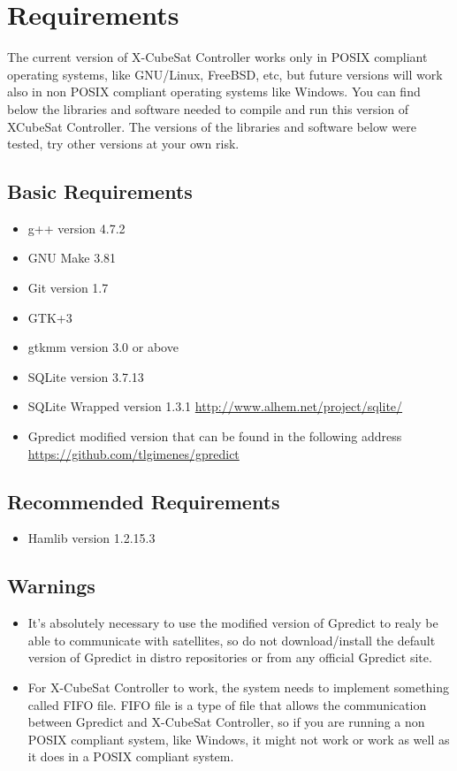 \documentclass[pdftex,11pt,a4paper,titlepage]{report}
\begin{document}
\chapter{Requirements}
\hspace{0.4cm} The current version of X-CubeSat Controller works only in POSIX compliant operating systems, like GNU/Linux, FreeBSD, etc, but future versions will work also in non POSIX compliant operating systems like Windows. You can find below the libraries and software needed to compile and run this version of XCubeSat Controller. The versions of the libraries and software below were tested, try other versions at your own risk.

\section{Basic Requirements}
\begin{itemize}
\item g++ version 4.7.2
\item GNU Make 3.81
\item Git version 1.7
\item GTK+3 
\item gtkmm version 3.0 or above
\item SQLite version 3.7.13
\item SQLite Wrapped version 1.3.1 \url{http://www.alhem.net/project/sqlite/}
\item Gpredict modified version that can be found in the following address \url{https://github.com/tlgimenes/gpredict} 
\end{itemize}

\section{Recommended Requirements}
\begin{itemize}
\item Hamlib version 1.2.15.3
\end{itemize}

\section{Warnings}
\begin{itemize}
\item It's absolutely necessary to use the modified version of Gpredict to realy be able to communicate with satellites, so do not download/install
the default version of Gpredict in distro repositories or from any official Gpredict site. 
\item For X-CubeSat Controller to work, the system needs to implement something called FIFO file. FIFO file is a type of file that allows the communication between Gpredict and X-CubeSat Controller, so if you are running a non POSIX compliant system, like Windows, it might not work or work as well as it does in a POSIX compliant system.
\end{itemize}
\end{document}
